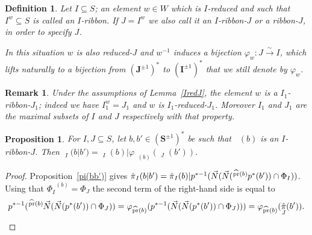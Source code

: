 \documentclass{amsart}
\numberwithin{equation}{section}
\newtheorem{proposition}[equation]{Proposition}
\newtheorem{definition}[equation]{Definition}
\newtheorem{remark}[equation]{Remark}
\newcommand\vN{\vec N}
\newcommand\lexp[2]{\kern\scriptspace\vphantom{#2}^{#1}\kern-\scriptspace#2}
\newcommand\inv{^{-1}}
\newcommand\bI{{\mathbf I}}
\newcommand\bJ{{\mathbf J}}
\newcommand\bS{{\mathbf S}}
\DeclareMathOperator\hpr{\widehat{pr}}
\DeclareMathOperator\hpi{\hat\pi}
\begin{document}
\begin{definition} Let $I\subseteq S$;
an element $w\in W$ which is $I$-reduced and such that $I^w\subseteq S$
is called an $I$-ribbon. If $J=I^w$ we also call it an
$I$-ribbon-$J$ or a ribbon-$J$, in order to specify $J$.

In this situation $w$ is also reduced-$J$ and $w\inv$ induces a bijection
$\varphi_w:J\xrightarrow\sim I$, which lifts naturally to
a bijection from $(\bJ^{\pm1})^*$ to $(\bI^{\pm1})^*$ that
we still denote by $\varphi_w$.
%
%
\end{definition}
\begin{remark}
Under the assumptions of Lemma~\ref{IredJ}, the element $w$ is a
 $I_1$-ribbon-$J_1$;
indeed we have $I_1^w=J_1$ and $w$ is $I_1$-reduced-$J_1$.
Moreover $I_1$ and $J_1$
are the maximal subsets of $I$ and $J$ respectively with that property.
\end{remark}
\begin{proposition}\label{ribbon}
For $I,J\subseteq S$, let $b,b'\in(\bS^{\pm1})^*$ be such that $\hpr(b)$ is an
$I$-ribbon-$J$.
Then  $\hpi_I(b|b')=\hpi_I(b)|\varphi_{\hpr(b)}(\hpi_J(b'))$.
\end{proposition}
\begin{proof}
Proposition~\ref{pi(bb')} gives
$\hpi_I(b|b')=\hpi_I(b)|p^{*-1}(\vN(\vN(\lexp{\hpr(b)}p^*(b'))\cap \Phi_I))$.
Using that $\Phi_I^{\hpr(b)}=\Phi_J$ the second term of the right-hand side is equal
to
$$p^{*-1}(\lexp{\hpr(b)}\vN(\vN(p^*(b'))\cap \Phi_J))=
 \varphi_{\hpr(b)}(p^{*-1}(\vN(\vN(p^*(b'))\cap \Phi_J)))=\varphi_{\hpr(b)}(\hpi_J(b')).$$
\end{proof}
\end{document}
